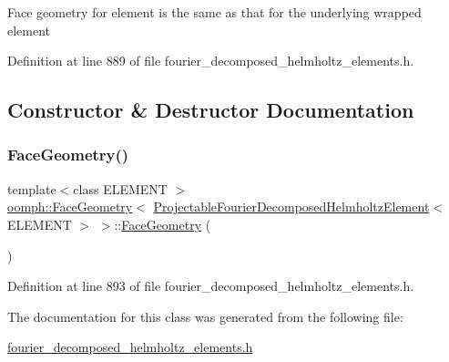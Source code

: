 Face geometry for element is the same as that for the underlying wrapped element 

Definition at line 889 of file fourier\+\_\+decomposed\+\_\+helmholtz\+\_\+elements.\+h.



\subsection{Constructor \& Destructor Documentation}
\mbox{\label{classoomph_1_1FaceGeometry_3_01ProjectableFourierDecomposedHelmholtzElement_3_01ELEMENT_01_4_01_4_ae66c47760c8d9585eac5259781f88b32}} 
\subsubsection{\texorpdfstring{Face\+Geometry()}{FaceGeometry()}}
{\footnotesize\ttfamily template$<$class E\+L\+E\+M\+E\+NT $>$ \\
\hyperlink{classoomph_1_1FaceGeometry}{oomph\+::\+Face\+Geometry}$<$ \hyperlink{classoomph_1_1ProjectableFourierDecomposedHelmholtzElement}{Projectable\+Fourier\+Decomposed\+Helmholtz\+Element}$<$ E\+L\+E\+M\+E\+NT $>$ $>$\+::\hyperlink{classoomph_1_1FaceGeometry}{Face\+Geometry} (\begin{DoxyParamCaption}{ }\end{DoxyParamCaption})\hspace{0.3cm}{\ttfamily [inline]}}



Definition at line 893 of file fourier\+\_\+decomposed\+\_\+helmholtz\+\_\+elements.\+h.



The documentation for this class was generated from the following file\+:\begin{DoxyCompactItemize}
\item 
\hyperlink{fourier__decomposed__helmholtz__elements_8h}{fourier\+\_\+decomposed\+\_\+helmholtz\+\_\+elements.\+h}\end{DoxyCompactItemize}
